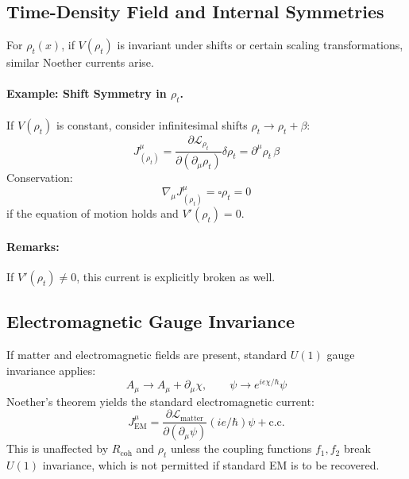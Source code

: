 \subsection{Time-Density Field and Internal Symmetries}

For $\rho_t(x)$, if $V(\rho_t)$ is invariant under shifts or certain scaling transformations, similar Noether currents arise.

\paragraph{Example: Shift Symmetry in $\rho_t$.}
If $V(\rho_t)$ is constant, consider infinitesimal shifts $\rho_t \to \rho_t + \beta$:
\[
J^\mu_{(\rho_t)} = \frac{\partial \mathcal{L}_{\rho_t}}{\partial (\partial_\mu \rho_t)} \delta \rho_t = \partial^\mu \rho_t\, \beta
\]
Conservation:
\[
\nabla_\mu J^\mu_{(\rho_t)} = \square \rho_t = 0
\]
if the equation of motion holds and $V'(\rho_t) = 0$.

\paragraph{Remarks:}
If $V'(\rho_t) \neq 0$, this current is explicitly broken as well.

\subsection{Electromagnetic Gauge Invariance}

If matter and electromagnetic fields are present, standard $U(1)$ gauge invariance applies:
\[
A_\mu \to A_\mu + \partial_\mu \chi, \qquad \psi \to e^{ie\chi/\hbar} \psi
\]
Noether's theorem yields the standard electromagnetic current:
\[
J^\mu_{\mathrm{EM}} = \frac{\partial \mathcal{L}_{\mathrm{matter}}}{\partial (\partial_\mu \psi)} (i e / \hbar) \psi + \text{c.c.}
\]
This is unaffected by $R_{\mathrm{coh}}$ and $\rho_t$ unless the coupling functions $f_1, f_2$ break $U(1)$ invariance, which is not permitted if standard EM is to be recovered.


